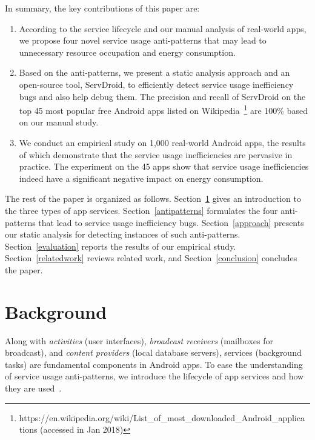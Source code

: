 \documentclass[sigconf,review, anonymous]{acmart}
\begin{document}
In summary, the key contributions of this paper are:
\begin{enumerate}
\item According to the service lifecycle and our manual analysis of real-world apps, we propose four novel service usage
anti-patterns that may lead to unnecessary resource occupation and energy
consumption.
\item Based on the anti-patterns, we present a static analysis approach and an
open-source tool, \textsf{ServDroid}, to efficiently detect service usage
inefficiency bugs and also help debug them. The precision and recall of
\textsf{ServDroid} on the top 45 most popular free Android apps listed on
Wikipedia~\footnote{https://en.wikipedia.org/wiki/List\_of\_most\_downloaded\_Android\_applica\\tions
(accessed in Jan 2018)} are 100\% based on our manual study.
\item We conduct an empirical study on 1,000 real-world Android apps, the
results of which demonstrate that the service usage inefficiencies are pervasive
in practice. The experiment on the 45 apps show that service usage inefficiencies indeed have a significant negative impact on energy consumption.
\end{enumerate}

The rest of the paper is organized as follows. Section~\ref{background} gives an
introduction to the three types of app services.
Section~\ref{antipatterns} formulates the four anti-patterns that lead to
service usage inefficiency bugs.
Section~\ref{approach} presents our static analysis for detecting instances
of such anti-patterns.
Section~\ref{evaluation} reports the results of our empirical study.
Section~\ref{relatedwork} reviews related work, and
Section~\ref{conclusion} concludes the paper.

\section{Background}\label{background}
Along with \textit{activities} (user interfaces),
\textit{broadcast receivers} (mailboxes for broadcast), and \textit{content providers} (local database servers), services (background tasks) are fundamental components in Android apps. To ease the understanding of service usage anti-patterns, we introduce the lifecycle of app services and how they are used~\cite{Androidservice}.
\end{document}
